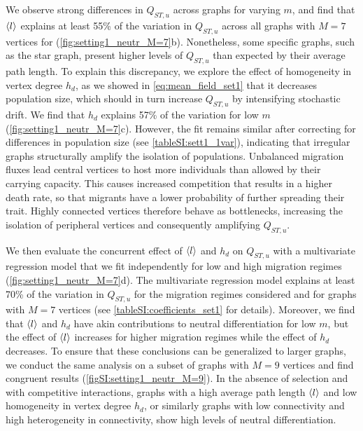 We observe strong differences in $Q_{ST,u}$ across graphs for varying $m$, and find that $\langle l \rangle$ explains at least 55\% of the variation in $Q_{ST,u}$ across all graphs with $M=7$ vertices for (\cref{fig:setting1_neutr_M=7}b). Nonetheless, some specific graphs, such as the star graph, present higher levels of $Q_{ST,u}$ than expected by their average path length. To explain this discrepancy, we explore the effect of homogeneity in vertex degree $h_d$, as we showed in \cref{eq:mean_field_set1} that it decreases population size, which should in turn increase $Q_{ST,u}$ by intensifying stochastic drift.
%
We find that $h_d$ explains 57\% of the variation for low $m$ (\cref{fig:setting1_neutr_M=7}c). However, the fit remains similar after correcting for differences in population size (see \cref{tableSI:sett1_1var}), indicating that irregular graphs structurally amplify the isolation of populations. Unbalanced migration fluxes lead central vertices to host more individuals than allowed by their carrying capacity. This causes increased competition that results in a higher death rate, so that migrants have a lower probability of further spreading their trait. Highly connected vertices therefore behave as bottlenecks, increasing the isolation of peripheral vertices and consequently amplifying $Q_{ST,u}$.

We then evaluate the concurrent effect of $\langle l \rangle$ and $h_d$ on $Q_{ST,u}$ with a multivariate regression model that we fit independently for low and high migration regimes (\cref{fig:setting1_neutr_M=7}d).
%
The multivariate regression model explains at least 70\% of the variation in $Q_{ST,u}$ for the migration regimes considered and for graphs with $M=7$ vertices (see \cref{tableSI:coefficients_set1} for details). Moreover, we find that $\langle l \rangle$ and $h_d$ have akin contributions to neutral differentiation for low $m$, but the effect of $\langle l \rangle$ increases for higher migration regimes while the effect of $h_d$ decreases.
%
To ensure that these conclusions can be generalized to larger graphs, we conduct the same analysis on a subset of graphs with $M=9$ vertices and find congruent results (\cref{figSI:setting1_neutr_M=9}).
%
In the absence of selection and with competitive interactions, graphs with a high average path length $\langle l \rangle$ and low homogeneity in vertex degree $h_d$, or similarly graphs with low connectivity and high heterogeneity in connectivity, show high levels of neutral differentiation.

